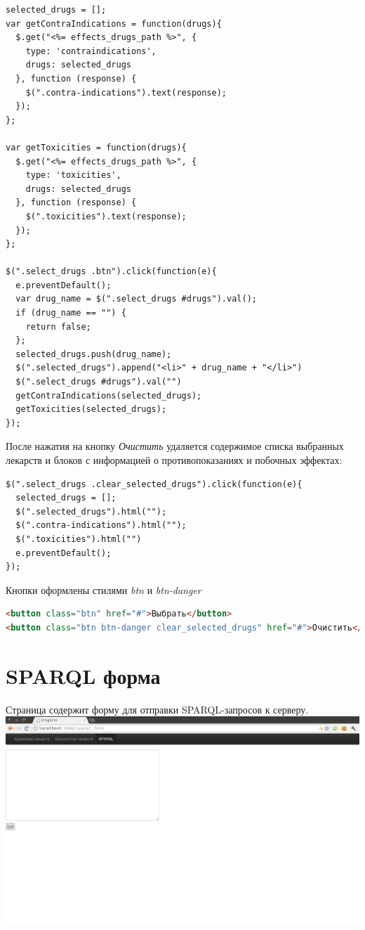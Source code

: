 \documentclass[specialist,subf,href,colorlinks=true
]{disser}
\begin{document}
\begin{lstlisting}
selected_drugs = [];
var getContraIndications = function(drugs){
  $.get("<%= effects_drugs_path %>", {
    type: 'contraindications',
    drugs: selected_drugs
  }, function (response) {
    $(".contra-indications").text(response);
  });
};

var getToxicities = function(drugs){
  $.get("<%= effects_drugs_path %>", {
    type: 'toxicities',
    drugs: selected_drugs
  }, function (response) {
    $(".toxicities").text(response);
  });
};

$(".select_drugs .btn").click(function(e){
  e.preventDefault();
  var drug_name = $(".select_drugs #drugs").val();
  if (drug_name == "") {
    return false;
  };
  selected_drugs.push(drug_name);
  $(".selected_drugs").append("<li>" + drug_name + "</li>")
  $(".select_drugs #drugs").val("")
  getContraIndications(selected_drugs);
  getToxicities(selected_drugs);
});
\end{lstlisting}

После нажатия на кнопку \textit{Очистить} удаляется содержимое списка выбранных лекарств и блоков с информацией о противопоказаниях и побочных эффектах:
\begin{lstlisting}
$(".select_drugs .clear_selected_drugs").click(function(e){
  selected_drugs = [];
  $(".selected_drugs").html("");			
  $(".contra-indications").html("");
  $(".toxicities").html("")
  e.preventDefault();
});
\end{lstlisting}

Кнопки оформлены стилями \textit{btn} и \textit{btn-danger}
\begin{lstlisting}[language=HTML]
<button class="btn" href="#">Выбрать</button>
<button class="btn btn-danger clear_selected_drugs" href="#">Очистить</button>
\end{lstlisting}

\section{SPARQL форма}
Страница содержит форму для отправки SPARQL-запросов к серверу.
\\ \includegraphics[width=160mm]{8.png}
\end{document}
